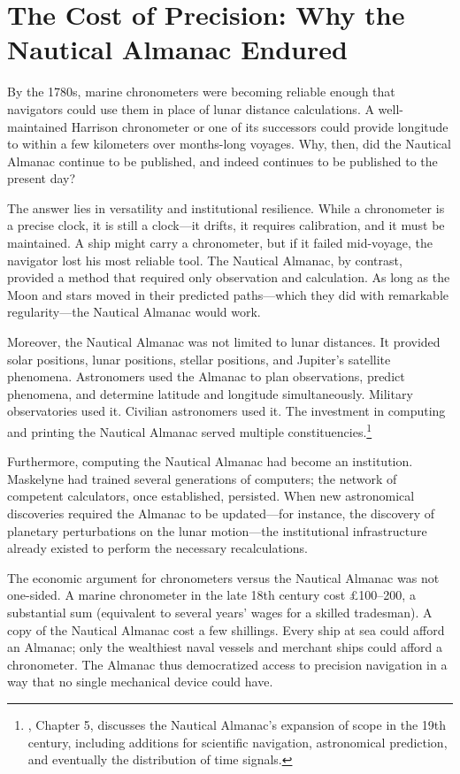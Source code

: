 \section{The Cost of Precision: Why the Nautical Almanac Endured}

By the 1780s, marine chronometers were becoming reliable enough that navigators could use them in place of lunar distance calculations. A well-maintained Harrison chronometer or one of its successors could provide longitude to within a few kilometers over months-long voyages. Why, then, did the Nautical Almanac continue to be published, and indeed continues to be published to the present day?

The answer lies in versatility and institutional resilience. While a chronometer is a precise clock, it is still a clock—it drifts, it requires calibration, and it must be maintained. A ship might carry a chronometer, but if it failed mid-voyage, the navigator lost his most reliable tool. The Nautical Almanac, by contrast, provided a method that required only observation and calculation. As long as the Moon and stars moved in their predicted paths—which they did with remarkable regularity—the Nautical Almanac would work.

Moreover, the Nautical Almanac was not limited to lunar distances. It provided solar positions, lunar positions, stellar positions, and Jupiter's satellite phenomena. Astronomers used the Almanac to plan observations, predict phenomena, and determine latitude and longitude simultaneously. Military observatories used it. Civilian astronomers used it. The investment in computing and printing the Nautical Almanac served multiple constituencies.\footnote{\textcite{Croarken2003}, Chapter 5, discusses the Nautical Almanac's expansion of scope in the 19th century, including additions for scientific navigation, astronomical prediction, and eventually the distribution of time signals.}

Furthermore, computing the Nautical Almanac had become an institution. Maskelyne had trained several generations of computers; the network of competent calculators, once established, persisted. When new astronomical discoveries required the Almanac to be updated—for instance, the discovery of planetary perturbations on the lunar motion—the institutional infrastructure already existed to perform the necessary recalculations.

The economic argument for chronometers versus the Nautical Almanac was not one-sided. A marine chronometer in the late 18th century cost £100--200, a substantial sum (equivalent to several years' wages for a skilled tradesman). A copy of the Nautical Almanac cost a few shillings. Every ship at sea could afford an Almanac; only the wealthiest naval vessels and merchant ships could afford a chronometer. The Almanac thus democratized access to precision navigation in a way that no single mechanical device could have.

